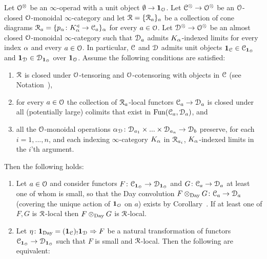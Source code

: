 \begin{proposition}
\label{proposition:smashing-day}%
Let $\mathcal{O}^{\otimes}$ be an $\infty$-operad with a unit object $\emptyset \to \mathbf{1}_{\mathcal{O}}$. 
Let $\mathcal C^{\otimes} \to \mathcal{O}^{\otimes}$ be an $\mathcal{O}$-closed $\mathcal{O}$-monoidal $\infty$-category and let $\mathcal{R} = \{\mathcal{R}_a\}_a$ be a collection of cone diagrams $\mathcal{R}_a = \{p_{\alpha}\colon K_{\alpha}^{\triangleleft} \to \mathcal C_a\}_{\alpha}$ for every $a \in \mathcal{O}$. Let $\mathcal{D}^{\otimes} \to \mathcal{O}^{\otimes}$ be an almost closed $\mathcal{O}$-monoidal $\infty$-category such that $\mathcal{D}_a$ admits $K_{\alpha}$-indexed limits for every index $\alpha$ and every $a \in \mathcal{O}$. In particular, $\mathcal C$ and $\mathcal{D}$ admits unit objects $\mathbf{1}_{\mathcal C} \in \mathcal C_{\mathbf{1}_{\mathcal{O}}}$ and $\mathbf{1}_{\mathcal{D}} \in \mathcal{D}_{\mathbf{1}_{\mathcal{O}}}$ over $\mathbf{1}_{\mathcal{O}}$. Assume the following conditions are satisfied:
\begin{enumerate}
\item
$\mathcal{R}$ is closed under $\mathcal{O}$-tensoring and $\mathcal{O}$-cotensoring with objects in $\mathcal C$ (see Notation~),
\item
\label{item:Rlocalclosedcolim}%
for every $a \in \mathcal{O}$ the collection of $\mathcal{R}_a$-local functors $\mathcal C_a \to \mathcal{D}_a$ is closed under all (potentially large) colimits that exist in $\operatorname{Fun}(\mathcal C_a,\mathcal{D}_a)$, 
and
\item
\label{item:OmonoidalpresKlimits}%
all the $\mathcal{O}$-monoidal operations $\alpha_{\mathcal{D}}\colon \mathcal{D}_{a_1} \times ... \times \mathcal{D}_{a_n} \to \mathcal{D}_b$ preserve, for each $i=1,...,n$, and each indexing $\infty$-category $K_{\alpha}$ in $\mathcal{R}_{a_i}$, $K_{\alpha}$-indexed limits in the $i$'th argument.
\end{enumerate}
Then the following holds:
\begin{enumerate}
\item
\label{item:ideal}%
Let $a \in \mathcal{O}$ and consider functors $F\colon \mathcal C_{\mathbf{1}_{\mathcal{O}}} \to \mathcal{D}_{\mathbf{1}_{\mathcal{O}}}$ and $G\colon \mathcal C_a \to \mathcal{D}_a$ at least one of whom is small, so that the Day convolution 
$F\otimes_{\mathrm{Day}} G\colon \mathcal C_a \to \mathcal{D}_a$ (covering the unique action of $\mathbf{1}_{\mathcal{O}}$ on $a$) exists by Corollary~\;. If at least one of $F,G$ is $\mathcal{R}$-local then $F\otimes_{\mathrm{Day}} G$ is $\mathcal{R}$-local.
\item
\label{item:equivalent}%
Let $\eta\colon\mathbf{1}_{\mathrm{Day}} = (\mathbf{1}_\mathcal C)_!\mathbf{1}_{\mathcal{D}} \Rightarrow F$ be a natural transformation of functors $\mathcal C_{\mathbf{1}_{\mathcal{O}}} \to \mathcal{D}_{\mathbf{1}_{\mathcal{O}}}$ such that $F$ is small and $\mathcal{R}$-local. Then the following are equivalent:
\begin{enumerate}[label=\alph*),ref=\alph*)]

\end{enumerate}
\end{enumerate}
\end{proposition}
